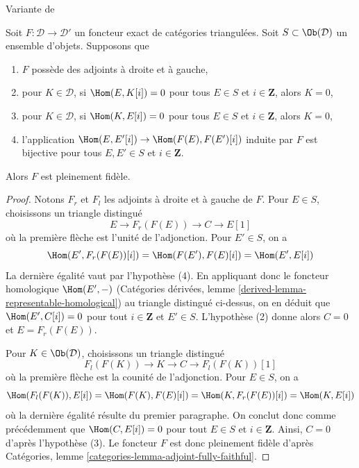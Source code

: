 \begin{lemma}
\label{lemma-get-fully-faithful}
\begin{reference}
Variante de \cite[Lemma 2.15]{Orlov-K3}
\end{reference}
Soit $F : \mathcal{D} \to \mathcal{D}'$ un foncteur exact de
catégories triangulées. Soit $S \subset \Ob(\mathcal{D})$ un
ensemble d'objets. Supposons que
\begin{enumerate}
\item $F$ possède des adjoints à droite et à gauche,
\item pour $K \in \mathcal{D}$, si $\Hom(E, K[i]) = 0$ pour tous
$E \in S$ et $i \in \mathbf{Z}$, alors $K = 0$,
\item pour $K \in \mathcal{D}$, si $\Hom(K, E[i]) = 0$ pour tous
$E \in S$ et $i \in \mathbf{Z}$, alors $K = 0$,
\item l'application $\Hom(E, E'[i]) \to \Hom(F(E), F(E')[i])$ induite par $F$
est bijective pour tous $E, E' \in S$ et $i \in \mathbf{Z}$.
\end{enumerate}
Alors $F$ est pleinement fidèle.
\end{lemma}

\begin{proof}
Notons $F_r$ et $F_l$ les adjoints à droite et à gauche de $F$. Pour
$E \in S$, choisissons un triangle distingué
$$
E \to F_r(F(E)) \to C \to E[1]
$$
où la première flèche est l'unité de l'adjonction. Pour $E' \in S$, on a
$$
\Hom(E', F_r(F(E))[i]) = \Hom(F(E'), F(E)[i]) = \Hom(E', E[i])
$$
La dernière égalité vaut par l'hypothèse (4).
En appliquant donc le foncteur homologique $\Hom(E', -)$
(Catégories dérivées, lemme \ref{derived-lemma-representable-homological})
au triangle distingué ci-dessus, on en déduit que $\Hom(E', C[i]) = 0$
pour tout $i \in \mathbf{Z}$ et $E' \in S$. L'hypothèse (2) donne alors
$C = 0$ et $E = F_r(F(E))$.

\medskip\noindent
Pour $K \in \Ob(\mathcal{D})$, choisissons un triangle distingué
$$
F_l(F(K)) \to K \to C \to F_l(F(K))[1]
$$
où la première flèche est la counité de l'adjonction. Pour $E \in S$,
on a
$$
\Hom(F_l(F(K)), E[i]) = \Hom(F(K), F(E)[i]) =
\Hom(K, F_r(F(E))[i]) = \Hom(K, E[i])
$$
où la dernière égalité résulte du premier paragraphe.
On conclut donc comme précédemment que $\Hom(C, E[i]) = 0$ pour tout $E \in S$
et $i \in \mathbf{Z}$. Ainsi, $C = 0$ d'après l'hypothèse (3).
Le foncteur $F$ est donc pleinement fidèle d'après Catégories, lemme
\ref{categories-lemma-adjoint-fully-faithful}.
\end{proof}

